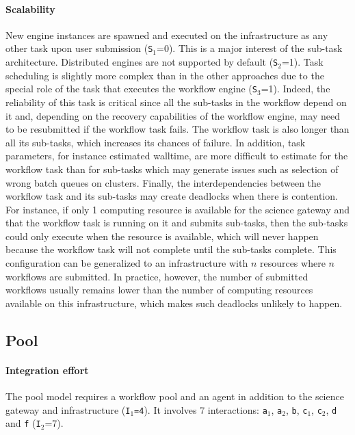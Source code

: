 \documentclass[preprint,3p,twocolumn]{elsarticle}
\begin{document}
\paragraph{Scalability}
New engine instances are spawned and executed on the infrastructure as
any other task upon user submission (\texttt{S$_1$}=0). This is a
major interest of the sub-task architecture. Distributed engines are
not supported by default (\texttt{S$_2$}=1). Task scheduling is
slightly more complex than in the other approaches due to the special
role of the task that executes the workflow engine
(\texttt{S$_3$}=1). Indeed, the reliability of this task is critical
since all the sub-tasks in the workflow depend on it and, depending on
the recovery capabilities of the workflow engine, may need to be
resubmitted if the workflow task fails. The workflow task is also
longer than all its sub-tasks, which increases its chances of
failure. In addition, task parameters, for instance estimated
walltime, are more difficult to estimate for the workflow task than
for sub-tasks which may generate issues such as selection of wrong
batch queues on clusters. Finally, the interdependencies between the
workflow task and its sub-tasks may create deadlocks when there is
contention. For instance, if only 1 computing resource is
available for the science gateway and that the workflow task is
running on it and submits sub-tasks, then the sub-tasks could only
execute when the resource is available, which will never happen
because the workflow task will not complete until the sub-tasks
complete. This configuration can be generalized to an infrastructure
with $n$ resources where $n$ workflows are submitted. In practice,
however, the number of submitted workflows usually remains lower than
the number of computing resources available on this infrastructure,
which makes such deadlocks unlikely to happen.

\subsection{Pool}

\paragraph{Integration effort} The pool model requires a workflow pool and an
agent in addition to the science gateway and infrastructure
(\texttt{I$_1$=4}). It involves 7 interactions: \texttt{a$_1$},
\texttt{a$_2$}, \texttt{b}, \texttt{c$_1$}, \texttt{c$_2$}, \texttt{d}
and \texttt{f} (\texttt{I$_2$}=7).
\end{document}
